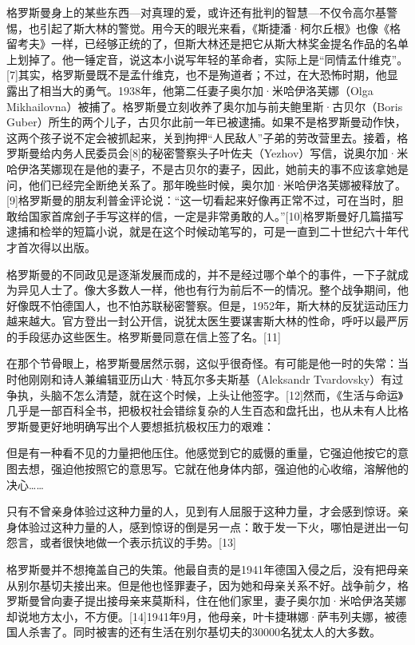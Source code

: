格罗斯曼身上的某些东西—对真理的爱，或许还有批判的智慧—不仅令高尔基警惕，也引起了斯大林的警觉。用今天的眼光来看，《斯捷潘·柯尔丘根》也像《格留考夫》一样，已经够正统的了，但斯大林还是把它从斯大林奖金提名作品的名单上划掉了。他一锤定音，说这本小说写年轻的革命者，实际上是“同情孟什维克”。[7]其实，格罗斯曼既不是孟什维克，也不是殉道者；不过，在大恐怖时期，他显露出了相当大的勇气。1938年，他第二任妻子奥尔加·米哈伊洛芙娜（Olga Mikhailovna）被捕了。格罗斯曼立刻收养了奥尔加与前夫鲍里斯·古贝尔（Boris Guber）所生的两个儿子，古贝尔此前一年已被逮捕。如果不是格罗斯曼动作快，这两个孩子说不定会被抓起来，关到拘押“人民敌人”子弟的劳改营里去。接着，格罗斯曼给内务人民委员会[8]的秘密警察头子叶佐夫（Yezhov）写信，说奥尔加·米哈伊洛芙娜现在是他的妻子，不是古贝尔的妻子，因此，她前夫的事不应该拿她是问，他们已经完全断绝关系了。那年晚些时候，奥尔加·米哈伊洛芙娜被释放了。[9]格罗斯曼的朋友利普金评论说：“这一切看起来好像再正常不过，可在当时，胆敢给国家首席刽子手写这样的信，一定是非常勇敢的人。”[10]格罗斯曼好几篇描写逮捕和检举的短篇小说，就是在这个时候动笔写的，可是一直到二十世纪六十年代才首次得以出版。

格罗斯曼的不同政见是逐渐发展而成的，并不是经过哪个单个的事件，一下子就成为异见人士了。像大多数人一样，他也有行为前后不一的情况。整个战争期间，他好像既不怕德国人，也不怕苏联秘密警察。但是，1952年，斯大林的反犹运动压力越来越大。官方登出一封公开信，说犹太医生要谋害斯大林的性命，呼吁以最严厉的手段惩办这些医生。格罗斯曼同意在信上签了名。[11]

在那个节骨眼上，格罗斯曼居然示弱，这似乎很奇怪。有可能是他一时的失常：当时他刚刚和诗人兼编辑亚历山大·特瓦尔多夫斯基（Aleksandr Tvardovsky）有过争执，头脑不怎么清楚，就在这个时候，上头让他签字。[12]然而，《生活与命运》几乎是一部百科全书，把极权社会错综复杂的人生百态和盘托出，也从未有人比格罗斯曼更好地明确写出个人要想抵抗极权压力的艰难：

但是有一种看不见的力量把他压住。他感觉到它的威慑的重量，它强迫他按它的意图去想，强迫他按照它的意思写。它就在他身体内部，强迫他的心收缩，溶解他的决心……

只有不曾亲身体验过这种力量的人，见到有人屈服于这种力量，才会感到惊讶。亲身体验过这种力量的人，感到惊讶的倒是另一点：敢于发一下火，哪怕是迸出一句怨言，或者很快地做一个表示抗议的手势。[13]

格罗斯曼并不想掩盖自己的失策。他最自责的是1941年德国入侵之后，没有把母亲从别尔基切夫接出来。但是他也怪罪妻子，因为她和母亲关系不好。战争前夕，格罗斯曼曾向妻子提出接母亲来莫斯科，住在他们家里，妻子奥尔加·米哈伊洛芙娜却说地方太小，不方便。[14]1941年9月，他母亲，叶卡捷琳娜·萨韦列夫娜，被德国人杀害了。同时被害的还有生活在别尔基切夫的30000名犹太人的大多数。

